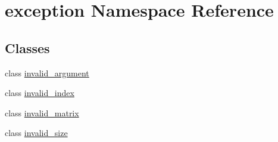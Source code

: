 \hypertarget{namespaceexception}{}\section{exception Namespace Reference}
\label{namespaceexception}
\subsection*{Classes}
\begin{DoxyCompactItemize}
\item 
class \mbox{\hyperlink{classexception_1_1invalid__argument}{invalid\+\_\+argument}}
\item 
class \mbox{\hyperlink{classexception_1_1invalid__index}{invalid\+\_\+index}}
\item 
class \mbox{\hyperlink{classexception_1_1invalid__matrix}{invalid\+\_\+matrix}}
\item 
class \mbox{\hyperlink{classexception_1_1invalid__size}{invalid\+\_\+size}}
\end{DoxyCompactItemize}
